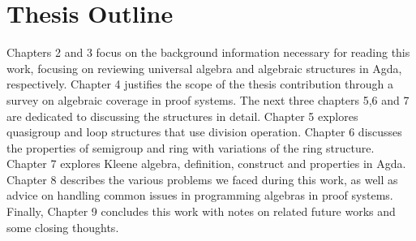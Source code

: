 \section{Thesis Outline}
Chapters 2 and 3 focus on the background information necessary for reading this
work, focusing on reviewing universal algebra and algebraic structures in Agda,
respectively. Chapter 4 justifies the scope of the thesis contribution through a
survey on algebraic coverage in proof systems. The next three chapters 5,6 and 7
are dedicated to discussing the structures in detail. Chapter 5 explores
quasigroup and loop structures that use division operation. Chapter 6 discusses
the properties of semigroup and ring with variations of the ring structure. Chapter
7 explores Kleene algebra, definition, construct and properties in Agda. Chapter
8 describes the various problems we faced during this work, as well as advice on
handling common issues in programming algebras in proof systems. Finally,
Chapter 9 concludes this work with notes on related future works and some
closing thoughts.
